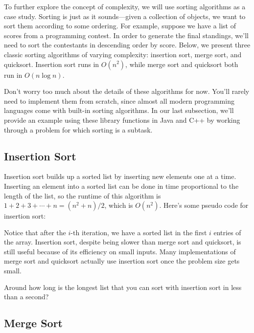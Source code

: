 To further explore the concept of complexity, we will use sorting algorithms as a case study. Sorting is just as it sounds---given a collection of objects, we want to sort them according to some ordering. For example, suppose we have a list of scores from a programming contest. In order to generate the final standings, we'll need to sort the contestants in descending order by score. Below, we present three classic sorting algorithms of varying complexity: insertion sort, merge sort, and quicksort. Insertion sort runs in $O(n^2)$, while merge sort and quicksort both run in $O(n\log n)$.

Don't worry too much about the details of these algorithms for now. You'll rarely need to implement them from scratch, since almost all modern programming languages come with built-in sorting algorithms. In our last subsection, we'll provide an example using these library functions in Java and C++ by working through a problem for which sorting is a subtask.


\subsection{Insertion Sort}

Insertion sort builds up a sorted list by inserting new elements one at a time. Inserting an element into a sorted list can be done in time proportional to the length of the list, so the runtime of this algorithm is $1 + 2 + 3 + \cdots + n = (n^2 + n) / 2$, which is $O(n^2)$. Here's some pseudo code for insertion sort:

Notice that after the $i$-th iteration, we have a sorted list in the first $i$ entries of the array. Insertion sort, despite being slower than merge sort and quicksort, is still useful because of its efficiency on small inputs. Many implementations of merge sort and quicksort actually use insertion sort once the problem size gets small.

\begin{exercise}
  Around how long is the longest list that you can sort with insertion sort in less than a second?
\end{exercise}

\subsection{Merge Sort}

